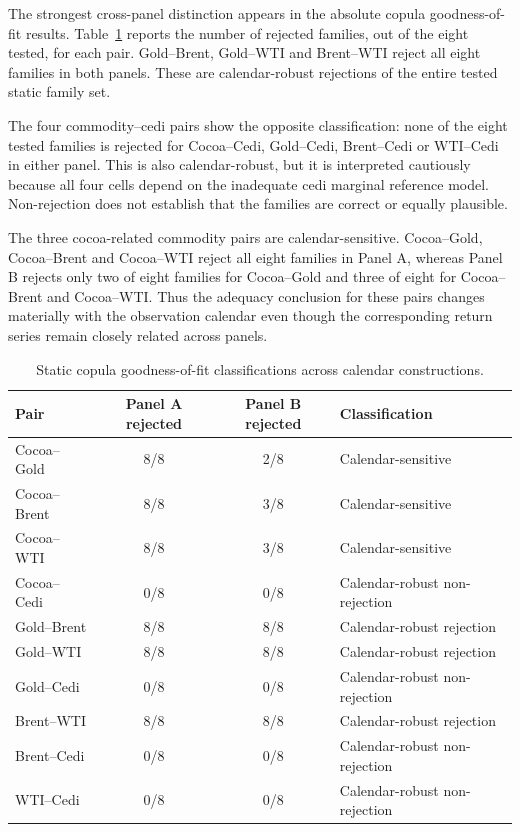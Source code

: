 The strongest cross-panel distinction appears in the absolute copula goodness-of-fit results. Table~\ref{tab:gof} reports the number of rejected families, out of the eight tested, for each pair. Gold--Brent, Gold--WTI and Brent--WTI reject all eight families in both panels. These are calendar-robust rejections of the entire tested static family set.

The four commodity--cedi pairs show the opposite classification: none of the eight tested families is rejected for Cocoa--Cedi, Gold--Cedi, Brent--Cedi or WTI--Cedi in either panel. This is also calendar-robust, but it is interpreted cautiously because all four cells depend on the inadequate cedi marginal reference model. Non-rejection does not establish that the families are correct or equally plausible.

The three cocoa-related commodity pairs are calendar-sensitive. Cocoa--Gold, Cocoa--Brent and Cocoa--WTI reject all eight families in Panel A, whereas Panel B rejects only two of eight families for Cocoa--Gold and three of eight for Cocoa--Brent and Cocoa--WTI. Thus the adequacy conclusion for these pairs changes materially with the observation calendar even though the corresponding return series remain closely related across panels.

\begin{table}[htbp]
\centering
\caption{Static copula goodness-of-fit classifications across calendar constructions.}
\label{tab:gof}
\small
\begin{tabularx}{\textwidth}{lccX}
\toprule
\textbf{Pair} & \textbf{Panel A rejected} & \textbf{Panel B rejected} & \textbf{Classification} \\
\midrule
Cocoa--Gold & 8/8 & 2/8 & Calendar-sensitive \\
Cocoa--Brent & 8/8 & 3/8 & Calendar-sensitive \\
Cocoa--WTI & 8/8 & 3/8 & Calendar-sensitive \\
Cocoa--Cedi & 0/8 & 0/8 & Calendar-robust non-rejection \\
Gold--Brent & 8/8 & 8/8 & Calendar-robust rejection \\
Gold--WTI & 8/8 & 8/8 & Calendar-robust rejection \\
Gold--Cedi & 0/8 & 0/8 & Calendar-robust non-rejection \\
Brent--WTI & 8/8 & 8/8 & Calendar-robust rejection \\
Brent--Cedi & 0/8 & 0/8 & Calendar-robust non-rejection \\
WTI--Cedi & 0/8 & 0/8 & Calendar-robust non-rejection \\
\bottomrule
\end{tabularx}
\end{table}

